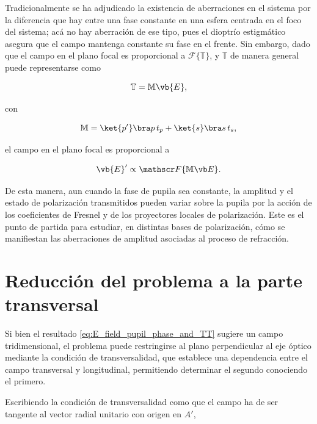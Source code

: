 Tradicionalmente se ha adjudicado la existencia de aberraciones en el sistema por la diferencia que hay entre una fase constante en una esfera centrada en el foco del sistema; acá no hay aberración de ese tipo, pues el dioptrío estigmático asegura que el campo mantenga constante su fase en el frente. Sin embargo, dado que el campo en el plano focal es proporcional a $\mathscr F\{\mathbb T\}$, y $\mathbb T$ de manera general puede representarse como

\begin{equation}
  \mathbb T
  =
  \mathbb M \vb{E},
\end{equation}

con

\begin{equation}
  \mathbb M
  =
  \ket{p'} \bra p\, t_p
  +
  \ket{s} \bra s\, t_s,
  \label{eq:def_M_bb}
\end{equation}

el campo en el plano focal es proporcional a

\begin{equation}
  \vb{E}'
  \propto
  \mathscr F \{\mathbb M \vb E\}.
\end{equation}

De esta manera, aun cuando la fase de pupila sea constante, la amplitud y el estado de polarización transmitidos pueden variar sobre la pupila por la acción de los coeficientes de Fresnel y de los proyectores locales de polarización. Este es el punto de partida para estudiar, en distintas bases de polarización, cómo se manifiestan las aberraciones de amplitud asociadas al proceso de refracción.

\section{Reducción del problema a la parte transversal}

Si bien el resultado \eqref{eq:E_field_pupil_phase_and_TT} sugiere un campo tridimensional, el problema puede restringirse al plano perpendicular al eje óptico mediante la condición de transversalidad, que establece una dependencia entre el campo transversal y longitudinal, permitiendo determinar el segundo conociendo el primero.

Escribiendo la condición de transversalidad como que el campo ha de ser tangente al vector radial unitario con origen en $A'$,

